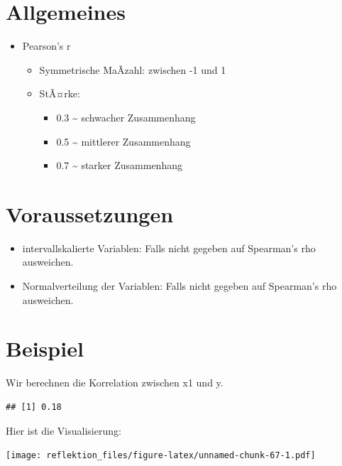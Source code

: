 \documentclass[
]{book}
\providecommand{\tightlist}{%
  \setlength{\itemsep}{0pt}\setlength{\parskip}{0pt}}
\begin{document}
\hypertarget{allgemeines-9}{%
\section{Allgemeines}\label{allgemeines-9}}

\begin{itemize}
\tightlist
\item
  Pearson's r

  \begin{itemize}
  \tightlist
  \item
    Symmetrische MaÃzahl: zwischen -1 und 1
  \item
    StÃ¤rke:

    \begin{itemize}
    \tightlist
    \item
      0.3 \textasciitilde{} schwacher Zusammenhang
    \item
      0.5 \textasciitilde{} mittlerer Zusammenhang
    \item
      0.7 \textasciitilde{} starker Zusammenhang
    \end{itemize}
  \end{itemize}
\end{itemize}

\hypertarget{voraussetzungen-1}{%
\section{Voraussetzungen}\label{voraussetzungen-1}}

\begin{itemize}
\tightlist
\item
  intervallskalierte Variablen: Falls nicht gegeben auf Spearman's rho ausweichen.
\item
  Normalverteilung der Variablen: Falls nicht gegeben auf Spearman's rho ausweichen.
\end{itemize}

\hypertarget{beispiel-3}{%
\section{Beispiel}\label{beispiel-3}}

Wir berechnen die Korrelation zwischen x1 und y.

\begin{verbatim}
## [1] 0.18
\end{verbatim}

Hier ist die Visualisierung:

\texttt{[image: reflektion\_files/figure-latex/unnamed-chunk-67-1.pdf]}
\end{document}

